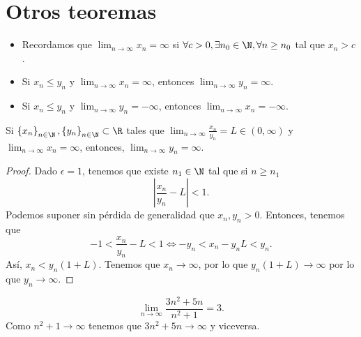 \section{Otros teoremas}

\begin{observation}
\normalfont 
\begin{itemize} Si $\displaystyle \left\{ x_{n}\right\} _{n\in\N}, \left\{ y_{n}\right\} _{n\in\N}\subset\R $,
\item Recordamos que $\displaystyle \lim_{n \to \infty}x_{n} = \infty $ si $\displaystyle \forall c > 0, \exists n_{0} \in \N, \forall n\geq n_{0}$ tal que $\displaystyle x_{n} > c $. 
\item Si $\displaystyle x_{n} \leq y_{n} $ y $\displaystyle \lim_{n \to \infty}x_{n} = \infty $, entonces $\displaystyle \lim_{n \to \infty}y_{n} = \infty $. 
\item Si $\displaystyle x_{n} \leq y_{n} $ y $\displaystyle \lim_{n \to \infty} y_{n} = - \infty $, entonces $\displaystyle \lim_{n \to \infty}x_{n} = - \infty $.
\end{itemize}
\end{observation}

\begin{fcolorary}[]
	\normalfont Si $\displaystyle \left\{ x_{n}\right\} _{n\in\N}, \left\{ y_{n}\right\} _{n\in\N} \subset \R $ tales que $\displaystyle \lim_{n \to \infty}\frac{x_{n}}{y_{n}} = L \in \left(0, \infty\right) $ y $\displaystyle \lim_{n \to \infty}x_{n} = \infty  $, entonces, $\displaystyle \lim_{n \to \infty} y_{n} =\infty  $.
\end{fcolorary}

\begin{proof}
Dado $\displaystyle \epsilon = 1 $, tenemos que existe $\displaystyle n_{1} \in \N $ tal que si $\displaystyle n \geq n_{1} $ 
\[ \left|\frac{x_{n}}{y_{n}}-L\right|<1 .\]
Podemos suponer sin pérdida de generalidad que $\displaystyle x_{n}, y_{n} > 0 $. Entonces, tenemos que
\[ - 1 < \frac{x_{n}}{y_{n}} - L < 1 \iff -y_{n} < x_{n} - y_{n}L < y_{n} .\]
Así, $\displaystyle x_{n} < y_{n}\left(1 + L\right) $. Tenemos que $\displaystyle x_{n} \to \infty $, por lo que $\displaystyle y_{n}\left(1+L\right) \to \infty $ por lo que $\displaystyle y_{n} \to \infty $.
\end{proof}

\begin{eg}
\normalfont 
\[\lim_{n \to \infty}\frac{3n^{2}+5n}{n^{2}+1} = 3 .\]
Como $\displaystyle n^{2} + 1 \to \infty $ tenemos que $\displaystyle 3n^{2} + 5n \to \infty $ y viceversa. 
\end{eg}

